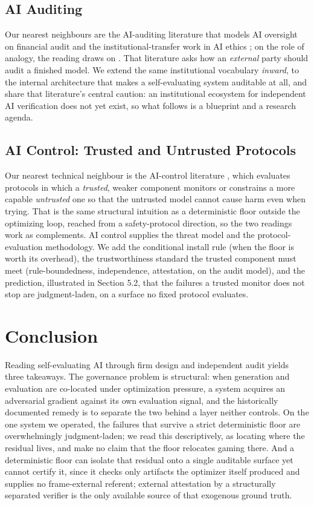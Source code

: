 \documentclass[11pt]{article}
\begin{document}
\subsection{AI Auditing}

Our nearest neighbours are the AI-auditing literature that models AI oversight on financial audit \citep{mokander_floridi2021,mokander2023,mokander2024,raji2020,raji2022} and the institutional-transfer work in AI ethics \citep{schultz2022}; on the role of analogy, the reading draws on \citet{hatz2025}. That literature asks how an \emph{external} party should audit a finished model. We extend the same institutional vocabulary \emph{inward}, to the internal architecture that makes a self-evaluating system auditable at all, and share that literature's central caution: an institutional ecosystem for independent AI verification does not yet exist, so what follows is a blueprint and a research agenda.

\subsection{AI Control: Trusted and Untrusted Protocols}

Our nearest technical neighbour is the AI-control literature \citep{greenblatt2023}, which evaluates protocols in which a \emph{trusted}, weaker component monitors or constrains a more capable \emph{untrusted} one so that the untrusted model cannot cause harm even when trying. That is the same structural intuition as a deterministic floor outside the optimizing loop, reached from a safety-protocol direction, so the two readings work as complements. AI control supplies the threat model and the protocol-evaluation methodology. We add the conditional install rule (when the floor is worth its overhead), the trustworthiness standard the trusted component must meet (rule-boundedness, independence, attestation, on the audit model), and the prediction, illustrated in Section 5.2, that the failures a trusted monitor does not stop are judgment-laden, on a surface no fixed protocol evaluates.

\section{Conclusion}

Reading self-evaluating AI through firm design and independent audit yields three takeaways. The governance problem is structural: when generation and evaluation are co-located under optimization pressure, a system acquires an adversarial gradient against its own evaluation signal, and the historically documented remedy is to separate the two behind a layer neither controls. On the one system we operated, the failures that survive a strict deterministic floor are overwhelmingly judgment-laden; we read this descriptively, as locating where the residual lives, and make no claim that the floor relocates gaming there. And a deterministic floor can isolate that residual onto a single auditable surface yet cannot certify it, since it checks only artifacts the optimizer itself produced and supplies no frame-external referent; external attestation by a structurally separated verifier is the only available source of that exogenous ground truth.
\end{document}
